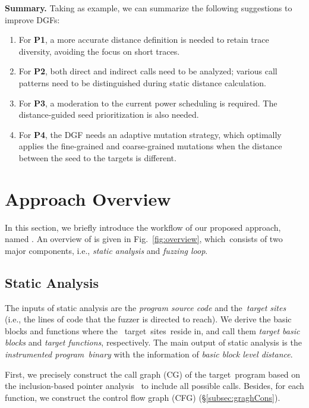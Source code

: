 \textbf{Summary.} Taking \aflgo as example, we can summarize the following suggestions to improve DGFs:

\begin{enumerate}[(1)] 
	\itemsep0em
	\item For \textbf{P1}, a more accurate distance definition is needed to retain trace diversity, avoiding the focus on short traces.
	\item For \textbf{P2}, both direct and indirect calls need to be analyzed; various call patterns need to be distinguished during static distance calculation.
	\item For \textbf{P3}, a moderation to the current power scheduling is required. The distance-guided seed prioritization is also needed. 
	\item For \textbf{P4}, the DGF needs an adaptive mutation strategy, which optimally applies the fine-grained and coarse-grained mutations when the distance between the seed to the targets is different.
\end{enumerate}


\section{Approach Overview}

In this section, we briefly introduce the workflow of our proposed approach, named \dFOT. An overview of \dFOT is given in Fig.~\ref{fig:overview}, which~consists of two major components, i.e., \textit{static analysis} and \textit{fuzzing loop}. 



\subsection{Static Analysis}\label{subsec:static_flow}

The inputs of static analysis are the \textit{program source code} and the~\textit{target sites} (i.e., the lines of code that the fuzzer is directed to reach). We derive the basic blocks and functions where the ~target~sites~reside in, and call them \textit{target basic blocks} and \textit{target functions}, respectively. The main output of static analysis is the \textit{instrumented program~binary} with the information of \textit{basic block level distance}.

First, we precisely construct the call graph (CG) of the target~program based on the inclusion-based pointer analysis~\cite{Andersen94programanalysis} to include all possible  calls. Besides, for each function, we construct the  control flow graph (CFG) (\S\ref{subsec:graghCons}).



